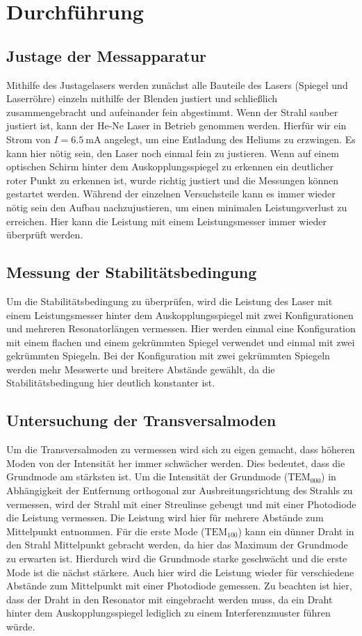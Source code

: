 \chapter{Durchführung}
\label{cha:Durchführung}

\section{Justage der Messapparatur}
Mithilfe des Justagelasers werden zunächst alle Bauteile des Lasers (Spiegel und Laserröhre) einzeln mithilfe der Blenden justiert und schließlich zusammengebracht und 
aufeinander fein abgestimmt. Wenn der Strahl sauber justiert ist, kann der He-Ne Laser in Betrieb genommen werden. Hierfür wir ein Strom von $I=\qty{6.5}{\milli\ampere}$
angelegt, um eine Entladung des Heliums zu erzwingen. Es kann hier nötig sein, den Laser noch einmal fein zu justieren. Wenn auf einem optischen Schirm hinter dem Auskopplungsspiegel
zu erkennen ein deutlicher roter Punkt zu erkennen ist, wurde richtig justiert und die Messungen können gestartet werden. Während der einzelnen Versuchsteile kann es immer wieder nötig sein
den Aufbau nachzujustieren, um einen minimalen Leistungsverlust zu erreichen. Hier kann die Leistung mit einem Leistungsmesser immer wieder überprüft werden.

\section{Messung der Stabilitätsbedingung}
Um die Stabilitätsbedingung zu überprüfen, wird die Leistung des Laser mit einem Leistungsmesser hinter dem Auskopplungsspiegel mit zwei Konfigurationen und mehreren Resonatorlängen vermessen.
Hier werden einmal eine Konfiguration mit einem flachen und einem gekrümmten Spiegel verwendet und einmal mit zwei gekrümmten Spiegeln. Bei der Konfiguration mit zwei gekrümmten Spiegeln werden
mehr Messwerte und breitere Abstände gewählt, da die Stabilitätsbedingung hier deutlich konstanter ist.

\section{Untersuchung der Transversalmoden}
\label{sec:TEM_durch}
Um die Transversalmoden zu vermessen wird sich zu eigen gemacht, dass höheren Moden von der Intensität her immer schwächer werden. Dies bedeutet, dass die Grundmode am stärksten ist. Um die Intensität der
Grundmode ($\mathrm{TEM}_{000}$) in Abhängigkeit der Entfernung orthogonal zur Ausbreitungsrichtung des Strahls zu vermessen, wird der Strahl mit einer Streulinse gebeugt und mit einer Photodiode die Leistung vermessen. Die Leistung
wird hier für mehrere Abstände zum Mittelpunkt entnommen. Für die erste Mode ($\mathrm{TEM}_{100}$) kann ein dünner Draht in den Strahl Mittelpunkt gebracht werden, da hier das Maximum der Grundmode zu erwarten ist. Hierdurch wird die Grundmode starke geschwächt
und die erste Mode ist die nächst stärkere. Auch hier wird die Leistung wieder für verschiedene Abstände zum Mittelpunkt mit einer Photodiode gemessen. Zu beachten ist hier, dass der Draht in den Resonator mit eingebracht werden muss,
da ein Draht hinter dem Auskopplungsspiegel lediglich zu einem Interferenzmuster führen würde.


